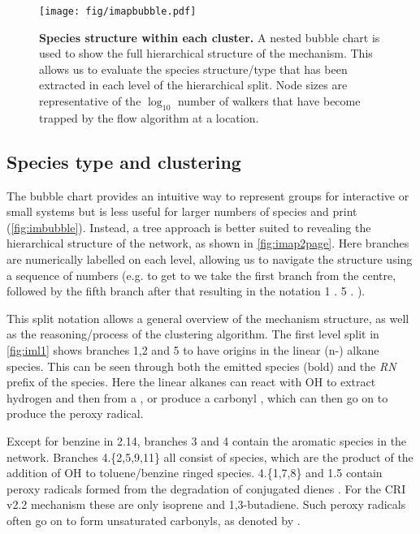 \begin{figure}[H]
  \centering
  \texttt{[image: fig/imapbubble.pdf]}
  \caption{\textbf{Species structure within each cluster.} A nested bubble chart is used to show the full hierarchical structure of the mechanism. This allows us to evaluate the species structure/type that has been extracted in each level of the hierarchical split. Node sizes are representative of the $\log_{10}$ number of walkers that have become trapped by the flow algorithm at a location. }
    \label{fig:imbubble}
\end{figure}




\subsection{Species type and clustering}
The bubble chart provides an intuitive way to represent groups for interactive or small systems but is less useful for larger numbers of species and print (\autoref{fig:imbubble}). Instead, a tree approach is better suited to revealing the hierarchical structure of the network, as shown in \autoref{fig:imap2page}. Here branches are numerically labelled on each level, allowing us to navigate the structure using a sequence of numbers (e.g. to get to  we take the first branch from the centre, followed by the fifth branch after that resulting in the notation 1 . 5 . ).

This split notation allows a general overview of the mechanism structure, as well as the reasoning/process of the clustering algorithm. The first level split in \autoref{fig:iml1} shows branches 1,2 and 5 to have origins in the linear (n-) alkane species. This can be seen through both the emitted species (bold) and the \emph{RN} prefix of the species. Here the linear alkanes can react with OH to extract hydrogen and then from a , or produce a carbonyl \emph{}, which can then go on to produce the \emph{} peroxy radical.

Except for benzine in 2.14, branches 3 and 4 contain the aromatic species in the network.  Branches 4.\{2,5,9,11\} all consist of \emph{} species, which are the product of the addition of OH to toluene/benzine ringed species. 4.\{1,7,8\} and 1.5 contain peroxy radicals formed from the degradation of conjugated dienes \emph{}. For the CRI v2.2 mechanism these are only isoprene and 1,3-butadiene. Such peroxy radicals often go on to form unsaturated carbonyls, as denoted by \emph{}.

